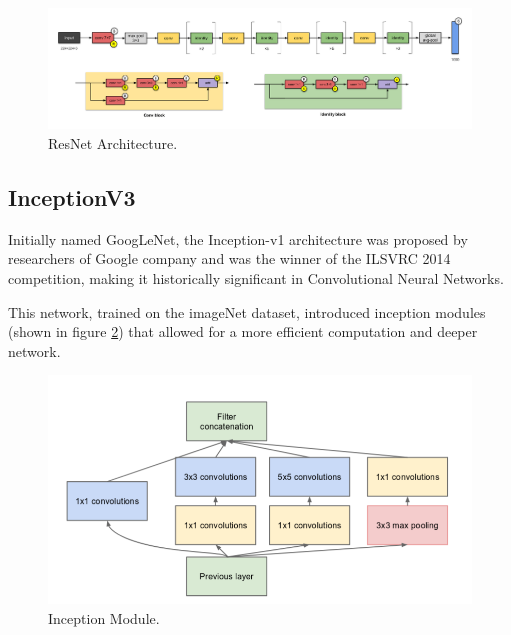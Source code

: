     

    \begin{figure}[htb]
        \centering
        \includegraphics[scale = 0.22]{Sections/2StateOfTheArt/2_images/resnet_arch.png}
        \caption{ResNet Architecture.\cite{cnnarchitectures}} 
        \label{fig:resnet}
    \end{figure}

\newpage

    \subsection{InceptionV3}

    \par Initially named GoogLeNet, the Inception-v1 architecture was proposed by researchers of Google company and was the winner of the ILSVRC 2014 competition, making it historically significant in Convolutional Neural Networks. 
    \par This network, trained on the imageNet dataset, introduced inception modules (shown in figure \ref{fig:inception_module}) that allowed for a more efficient computation and deeper network.

    \begin{figure}[htb]
        \centering
        \includegraphics[scale = 0.35]{Sections/2StateOfTheArt/2_images/inceptionArchitecture.png}
        \caption{Inception Module. \cite{inceptionV3web2}} 
        \label{fig:inception_module}
    \end{figure}

